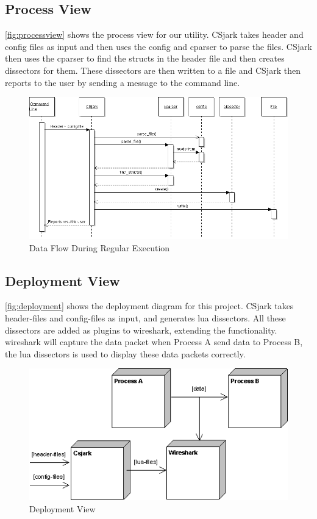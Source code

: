 \subsection{Process View}
\autoref{fig:processview} shows the process view for our \gls{utility}. CSjark takes \gls{header} and config files as input and then uses the config and cparser to parse the files. CSjark then uses the cparser to find the \glspl{struct} in the \gls{header} file and then creates \glspl{dissector} for them. These \glspl{dissector} are then written to a file and CSjark then reports to the user by sending a message to the command line.

\begin{figure}[htb]
	\includegraphics[width=\textwidth]{./planning/img/SequenceDiagram}
	\caption{Data Flow During Regular Execution\label{fig:processview}}
\end{figure}


\subsection{Deployment View}
\autoref{fig:deployment} shows the deployment diagram for this project. CSjark 
takes \gls{header}-files and config-files as input, and generates \Gls{lua} 
\glspl{dissector}. All these \glspl{dissector} are added as plugins to 
\Gls{wireshark}, extending the functionality. \Gls{wireshark} will capture the 
data packet when Process A send data to Process B, the \Gls{lua} 
\glspl{dissector} is used to display these data packets correctly.

\begin{figure}[htb]
	\includegraphics[width=\textwidth]{./planning/img/Deployment}
	\caption{Deployment View\label{fig:deployment}}
\end{figure}


